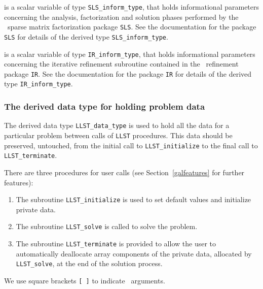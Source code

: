 \documentclass{galahad}
\newcommand{\packagename}{LLST}
\begin{document}
\begin{description}
 is a scalar variable of type {\tt SLS\_inform\_type},
that holds informational parameters concerning the analysis, factorization
and solution phases performed by
the \galahad\ sparse matrix factorization package {\tt SLS}.
See the documentation for the package {\tt SLS} for details of the
derived type {\tt SLS\_inform\_type}.

 is a scalar variable of type {\tt IR\_inform\_type},
that holds informational parameters concerning the iterative refinement
subroutine contained in the \galahad\ refinement package {\tt IR}.
See the documentation for the package {\tt IR} for details of the
derived type {\tt IR\_inform\_type}.


\end{description}


\subsubsection{The derived data type for holding problem data}\label{typedata}
The derived data type
{\tt \packagename\_data\_type}
is used to hold all the data for a particular problem between calls of
{\tt \packagename} procedures.
This data should be preserved, untouched, from the initial call to
{\tt \packagename\_initialize}
to the final call to
{\tt \packagename\_terminate}.


\galarguments
There are three procedures for user calls
(see Section~\ref{galfeatures} for further features):

\begin{enumerate}
\item The subroutine
      {\tt \packagename\_initialize}
      is used to set default values and initialize private data.
\item The subroutine
      {\tt \packagename\_solve}
      is called to solve the problem.
\item The subroutine
      {\tt \packagename\_terminate}
      is provided to allow the user to automatically deallocate array
       components of the private data, allocated by
       {\tt \packagename\_solve},
       at the end of the solution process.
\end{enumerate}
We use square brackets {\tt [ ]} to indicate \optional\ arguments.

\end{document}
